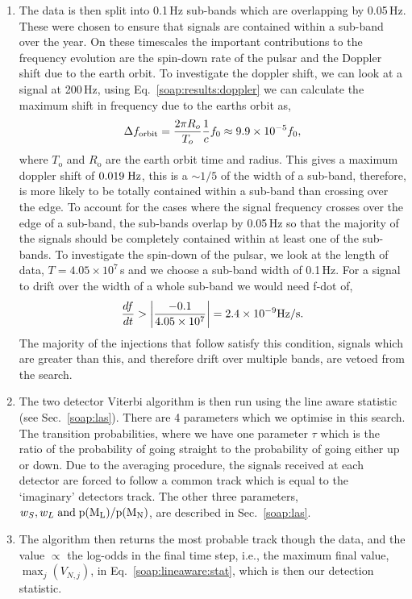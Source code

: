 \begin{enumerate}
\item The data is then split into 0.1\,Hz sub-bands which are overlapping by 0.05\,Hz. These were chosen to ensure that signals are contained within a sub-band over the year. On these timescales the important contributions to the frequency evolution are the spin-down rate of the pulsar and the Doppler shift due to the earth orbit.
To investigate the doppler shift, we can look at a signal at 200\,Hz, using Eq.~\ref{soap:results:doppler} we can calculate the maximum shift in frequency due to the earths orbit as,
%
\begin{equation}
\label{soap:results:dforbit}
\Delta f_{\rm orbit} = \frac{2 \pi R_o}{T_o} \frac{1}{c} f_0 \approx 9.9 \times 10^{-5} f_0,
\end{equation}
%
where $T_{\text{o}}$ and $R_{\text{o}}$ are the
earth orbit time and radius. This gives a maximum doppler shift of $0.019 \; \rm{Hz}$, this is a $\sim 1/5$ of the width of a sub-band, therefore, is more likely to be totally contained within a sub-band than crossing over the edge.
To account for the cases where the signal frequency crosses over the edge of a sub-band, the sub-bands overlap by 0.05\,Hz so that the majority of the signals should be completely contained within at least one of the sub-bands.
To investigate the spin-down of the pulsar, we look at the length of data, $T=4.05 \times 10^7$\,s and we choose a sub-band width of 0.1\,Hz. For a signal to drift over the width of a whole sub-band we would need f-dot of,
\begin{equation}
\frac{df}{dt} > \left|\frac{-0.1}{4.05 \times 10^7}\right| = 2.4 \times 10^{-9} \rm{Hz/s}.
\end{equation}
The majority of the injections that follow satisfy this condition, signals which are greater than this, and therefore drift over multiple bands, are vetoed from the search.
%
\item The two detector Viterbi algorithm is then run using the line aware
statistic (see Sec.~\ref{soap:las}). There are 4 parameters which we optimise in this search. The transition probabilities, where we have one parameter $\tau$ which is the ratio of the probability
of going straight to the probability of going either up or down. Due to the averaging
procedure, the signals received at each detector are forced to follow a common track which is equal to the `imaginary' detectors track. The other three parameters, $w_S, w_L \; \rm{and} \; p(M_L)/p(M_N)$, are described in Sec.~\ref{soap:las}.
%
\item The algorithm then returns the most probable track though the data, and the value
$\propto$ the log-odds in the final time step, i.e., the
maximum final value, $\max_j(V_{N,j})$, in Eq.~\ref{soap:lineaware:stat}, which is then our detection statistic.

%
\end{enumerate}
